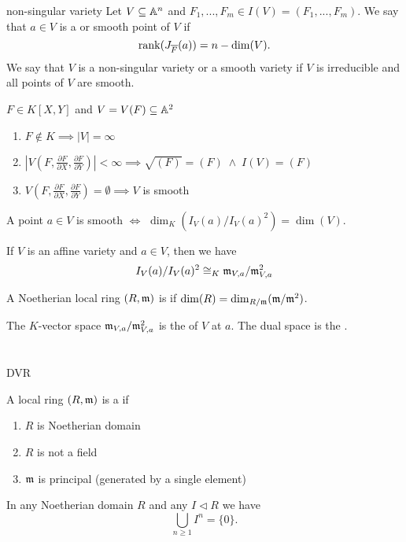 \documentclass[twoside, a4paper, 12pt]{book}
\begin{document}
\begin{definition}{non-singular variety}{}
  Let $V\subseteq\mathbb{A}^n$ and $F_1,..., F_m\in I(V)=(F_1,..., F_m)$. We say that $a\in V$ is a  or smooth point of $V$ if 
  $$\operatorname{rank}(J_{\overline{F}}(a))=n-\dim(V).$$
  We say that $V$ is a non-singular variety or a smooth variety if $V$ is irreducible and all points of $V$ are smooth.
\end{definition}

$F\in K[X,Y]$ and $V=V(F)\subseteq \mathbb{A}^2$
\begin{enumerate}
  \item $F\notin K\implies |V|=\infty$
  \item $|V(F, \frac{\partial F}{\partial X}, \frac{\partial F}{\partial Y})|<\infty\implies\sqrt{(F)}=(F)\;\land\;I(V)=(F)$
  \item $V(F, \frac{\partial F}{\partial X}, \frac{\partial F}{\partial Y})=\emptyset \implies V$ is smooth 
\end{enumerate}

\begin{lemma}{}{}
  A point $a\in V$ is smooth $\iff$ $\dim_K(I_V(a)/I_V(a)^2)=\dim(V)$.

  If $V$ is an affine variety and $a\in V$, then we have
  $$I_V(a)/I_V(a)^2\cong_K\mathfrak{m}_{V,a}/\mathfrak{m}_{V,a}^2$$
\end{lemma}


A Noetherian local ring $(R, \mathfrak{m})$ is  if $\dim(R)=\dim_{R/\mathfrak{m}}(\mathfrak{m}/\mathfrak{m}^2)$.

The $K$-vector space $\mathfrak{m}_{V,a}/\mathfrak{m}_{V,a}^2$ is the  of $V$ at $a$. The dual space is the .

\section{}{DVR}

A local ring $(R,\mathfrak{m})$ is a  if
\begin{enumerate}
  \item $R$ is Noetherian domain
  \item $R$ is not a field
  \item $\mathfrak{m}$ is principal (generated by a single element)
\end{enumerate}

In any Noetherian domain $R$ and any $I\triangleleft R$ we have
$$\bigcup_{n\geq 1}I^n=\{0\}.$$
\end{document}
